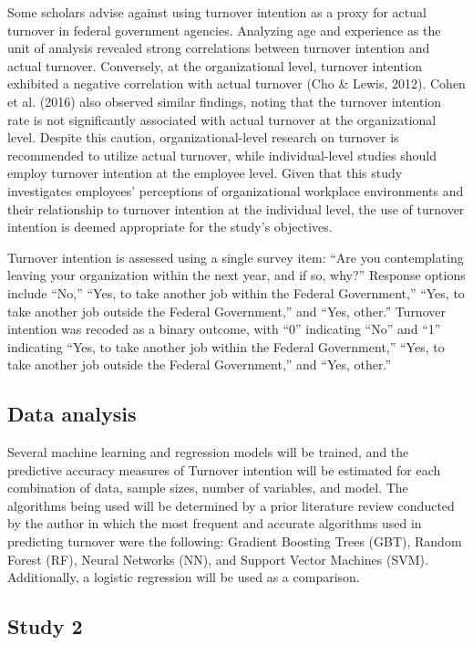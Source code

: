 \documentclass[
  man]{apa7}
\begin{document}
Some scholars advise against using turnover intention as a proxy for actual turnover in federal government agencies.
Analyzing age and experience as the unit of analysis revealed strong correlations between turnover intention and actual turnover.
Conversely, at the organizational level, turnover intention exhibited a negative correlation with actual turnover (Cho \& Lewis, 2012).
Cohen et al. (2016) also observed similar findings, noting that the turnover intention rate is not significantly associated with actual turnover at the organizational level.
Despite this caution, organizational-level research on turnover is recommended to utilize actual turnover, while individual-level studies should employ turnover intention at the employee level.
Given that this study investigates employees' perceptions of organizational workplace environments and their relationship to turnover intention at the individual level, the use of turnover intention is deemed appropriate for the study's objectives.

Turnover intention is assessed using a single survey item: ``Are you contemplating leaving your organization within the next year, and if so, why?'' Response options include ``No,'' ``Yes, to take another job within the Federal Government,'' ``Yes, to take another job outside the Federal Government,'' and ``Yes, other.'' Turnover intention was recoded as a binary outcome, with ``0'' indicating ``No'' and ``1'' indicating ``Yes, to take another job within the Federal Government,'' ``Yes, to take another job outside the Federal Government,'' and ``Yes, other.''

\hypertarget{data-analysis}{%
\subsection{Data analysis}\label{data-analysis}}

Several machine learning and regression models will be trained, and the predictive accuracy measures of Turnover intention will be estimated for each combination of data, sample sizes, number of variables, and model.
The algorithms being used will be determined by a prior literature review conducted by the author in which the most frequent and accurate algorithms used in predicting turnover were the following: Gradient Boosting Trees (GBT), Random Forest (RF), Neural Networks (NN), and Support Vector Machines (SVM).
Additionally, a logistic regression will be used as a comparison.

\hypertarget{study-2}{%
\subsection{Study 2}\label{study-2}}
\end{document}

